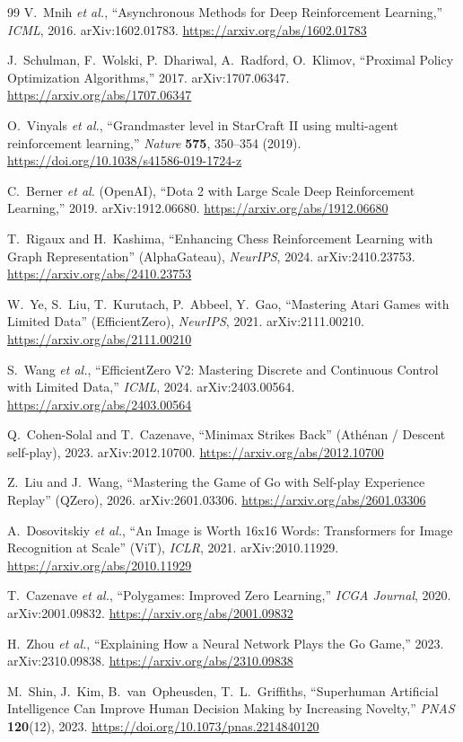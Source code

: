 \documentclass[11pt]{article}
\begin{document}
\begin{thebibliography}{99}
 V.~Mnih \emph{et al.},
  ``Asynchronous Methods for Deep Reinforcement Learning,'' \emph{ICML}, 2016.
  arXiv:1602.01783. \url{https://arxiv.org/abs/1602.01783}

 J.~Schulman, F.~Wolski, P.~Dhariwal, A.~Radford, O.~Klimov,
  ``Proximal Policy Optimization Algorithms,'' 2017. arXiv:1707.06347.
  \url{https://arxiv.org/abs/1707.06347}

 O.~Vinyals \emph{et al.},
  ``Grandmaster level in StarCraft II using multi-agent reinforcement learning,''
  \emph{Nature} \textbf{575}, 350--354 (2019).
  \url{https://doi.org/10.1038/s41586-019-1724-z}

 C.~Berner \emph{et al.} (OpenAI),
  ``Dota 2 with Large Scale Deep Reinforcement Learning,'' 2019. arXiv:1912.06680.
  \url{https://arxiv.org/abs/1912.06680}

 T.~Rigaux and H.~Kashima,
  ``Enhancing Chess Reinforcement Learning with Graph Representation'' (AlphaGateau),
  \emph{NeurIPS}, 2024. arXiv:2410.23753. \url{https://arxiv.org/abs/2410.23753}

 W.~Ye, S.~Liu, T.~Kurutach, P.~Abbeel, Y.~Gao,
  ``Mastering Atari Games with Limited Data'' (EfficientZero), \emph{NeurIPS}, 2021.
  arXiv:2111.00210. \url{https://arxiv.org/abs/2111.00210}

 S.~Wang \emph{et al.},
  ``EfficientZero V2: Mastering Discrete and Continuous Control with Limited Data,''
  \emph{ICML}, 2024. arXiv:2403.00564. \url{https://arxiv.org/abs/2403.00564}

 Q.~Cohen-Solal and T.~Cazenave,
  ``Minimax Strikes Back'' (Athénan / Descent self-play), 2023. arXiv:2012.10700.
  \url{https://arxiv.org/abs/2012.10700}

 Z.~Liu and J.~Wang,
  ``Mastering the Game of Go with Self-play Experience Replay'' (QZero), 2026.
  arXiv:2601.03306. \url{https://arxiv.org/abs/2601.03306}

 A.~Dosovitskiy \emph{et al.},
  ``An Image is Worth 16x16 Words: Transformers for Image Recognition at Scale'' (ViT),
  \emph{ICLR}, 2021. arXiv:2010.11929. \url{https://arxiv.org/abs/2010.11929}

 T.~Cazenave \emph{et al.},
  ``Polygames: Improved Zero Learning,'' \emph{ICGA Journal}, 2020. arXiv:2001.09832.
  \url{https://arxiv.org/abs/2001.09832}

 H.~Zhou \emph{et al.},
  ``Explaining How a Neural Network Plays the Go Game,'' 2023. arXiv:2310.09838.
  \url{https://arxiv.org/abs/2310.09838}

 M.~Shin, J.~Kim, B.~van~Opheusden, T.~L.~Griffiths,
  ``Superhuman Artificial Intelligence Can Improve Human Decision Making by Increasing
  Novelty,'' \emph{PNAS} \textbf{120}(12), 2023.
  \url{https://doi.org/10.1073/pnas.2214840120}

\end{thebibliography}
\end{document}
